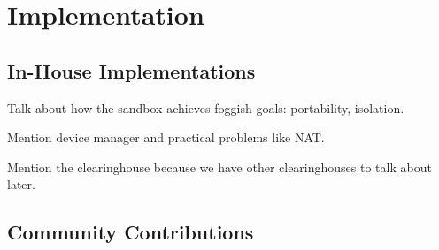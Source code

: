 \section{Implementation}

\subsection{In-House Implementations}

Talk about how the sandbox achieves foggish goals: portability, isolation.

Mention device manager and practical problems like NAT.

Mention the clearinghouse because we have other clearinghouses
to talk about later.

\subsection{Community Contributions}

